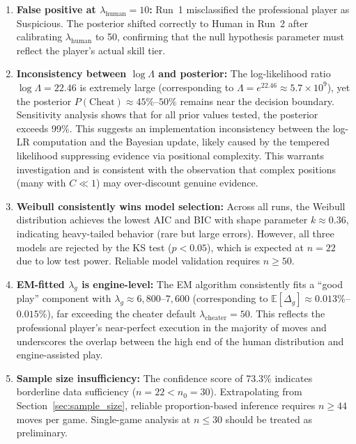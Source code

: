 \documentclass[11pt,a4paper]{article}
\newcommand{\E}{\mathbb{E}}
\begin{document}
\begin{enumerate}
    \item \textbf{False positive at $\lambda_{\text{human}} = 10$:}
          Run~1 misclassified the professional player as Suspicious.
          The posterior shifted correctly to Human in Run~2 after calibrating
          $\lambda_{\text{human}}$ to 50, confirming that the null hypothesis
          parameter must reflect the player's actual skill tier.

    \item \textbf{Inconsistency between $\log \Lambda$ and posterior:}
          The log-likelihood ratio $\log \Lambda = 22.46$ is extremely large
          (corresponding to $\Lambda = e^{22.46} \approx 5.7 \times 10^9$),
          yet the posterior $P(\text{Cheat}) \approx 45\%$--$50\%$ remains
          near the decision boundary. Sensitivity analysis shows that for
          all prior values tested, the posterior exceeds 99\%. This suggests
          an implementation inconsistency between the log-LR computation and
          the Bayesian update, likely caused by the tempered likelihood
          suppressing evidence via positional complexity. This warrants
          investigation and is consistent with the observation that complex
          positions (many with $C \ll 1$) may over-discount genuine evidence.

    \item \textbf{Weibull consistently wins model selection:}
          Across all runs, the Weibull distribution achieves the lowest AIC
          and BIC with shape parameter $k \approx 0.36$, indicating heavy-tailed
          behavior (rare but large errors). However, all three models are
          rejected by the KS test ($p < 0.05$), which is expected at $n = 22$
          due to low test power. Reliable model validation requires $n \geq 50$.

    \item \textbf{EM-fitted $\lambda_g$ is engine-level:}
          The EM algorithm consistently fits a ``good play'' component with
          $\lambda_g \approx 6{,}800$--$7{,}600$ (corresponding to
          $\E[\Delta_g] \approx 0.013\%$--$0.015\%$), far exceeding the
          cheater default $\lambda_{\text{cheater}} = 50$. This reflects the
          professional player's near-perfect execution in the majority of
          moves and underscores the overlap between the high end of the human
          distribution and engine-assisted play.

    \item \textbf{Sample size insufficiency:}
          The confidence score of 73.3\% indicates borderline data sufficiency
          ($n = 22 < n_0 = 30$). Extrapolating from Section~\ref{sec:sample_size},
          reliable proportion-based inference requires $n \geq 44$ moves per game.
          Single-game analysis at $n \leq 30$ should be treated as preliminary.
\end{enumerate}
\end{document}
